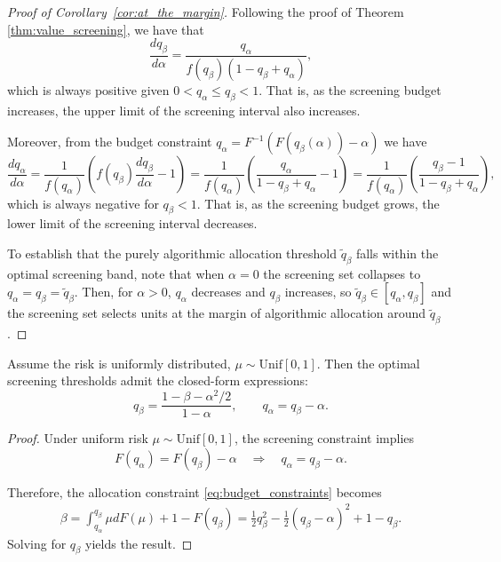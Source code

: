 \begin{proof}[Proof of Corollary~\ref{cor:at_the_margin}]

Following the proof of Theorem \ref{thm:value_screening}, we have that
$$\frac{dq_{\beta}}{d\alpha} = \frac{q_{\alpha}}{f(q_{\beta})(1 - q_{\beta} + q_{\alpha})},$$
which is always positive given $0 < q_{\alpha} \leq  q_{\beta} < 1$. That is, as the screening budget increases, the upper limit of the screening interval also increases.

Moreover, from the budget constraint $q_{\alpha} = F^{-1}(F(q_{\beta}(\alpha)) - \alpha)$ we have
$$\frac{dq_{\alpha}}{d\alpha} = \frac{1}{f(q_{\alpha})}\left(f(q_{\beta})\frac{dq_{\beta}}{d\alpha} - 1\right) = \frac{1}{f(q_{\alpha})}\left(\frac{q_{\alpha}}{1 - q_{\beta} + q_{\alpha}} - 1\right) = \frac{1}{f(q_{\alpha})}\left(\frac{q_{\beta} - 1}{1 - q_{\beta} + q_{\alpha}}\right),$$
which is always negative for $q_{\beta} < 1$. That is, as the screening budget grows, the lower limit of the screening interval decreases.

To establish that the purely algorithmic allocation threshold $\widetilde{q}_{\beta}$ falls within the optimal screening band, note that when $\alpha = 0$ the screening set collapses to $q_{\alpha} = q_{\beta} = \widetilde{q}_{\beta}$. Then, for $\alpha > 0$, $q_{\alpha}$ decreases and $q_{\beta}$ increases, so  $\widetilde{q}_{\beta} \in [q_{\alpha},  q_{\beta}]$ and the screening set selects units at the margin of algorithmic allocation around $\widetilde{q}_{\beta}$.
\end{proof}



\begin{corollary}
\label{cor:uniform}
    Assume the risk is uniformly distributed, $\mu \sim \text{Unif}[0, 1]$. Then the optimal screening thresholds admit the closed-form expressions:
    $$q_\beta = \frac{1-\beta-\alpha^2/2}{1-\alpha}, \qquad q_\alpha = q_\beta - \alpha.$$
\end{corollary}


\begin{proof}
Under uniform risk $\mu \sim \text{Unif}[0, 1]$, the screening constraint implies
$$F(q_{\alpha}) = F(q_{\beta}) - \alpha \quad\Longrightarrow\quad q_{\alpha} = q_{\beta} - \alpha.$$

Therefore, the allocation constraint \eqref{eq:budget_constraints} becomes 
\begin{align*}
    \beta = \int_{q_{\alpha}}^{q_{\beta}} \mu dF(\mu) + 1 - F(q_{\beta}) = \frac{1}{2}q_{\beta}^2 - \frac{1}{2}(q_{\beta} - \alpha)^2 + 1 - q_{\beta}.
\end{align*}
Solving for $q_{\beta}$ yields the result.
\end{proof}




